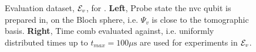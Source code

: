 \begin{figure}
    \begin{center}
        \qquad
    \end{center}
    \caption[Evaluation dataset for  ]{
        Evaluation dataset, ${ \mathcal{E} }_v$, for  . 
        \textbf{Left}, Probe state the \gls{nvc}  qubit is prepared in, on the Bloch sphere, 
            i.e. $\Psi_v$ is close to the tomographic basis. 
        \textbf{Right}, Time comb evaluated against, i.e. uniformly distributed times up to $t_{max} = 100 \mu \textrm{s}$ 
            are used for experiments in ${ \mathcal{E} }_v$. 
        }
    \label{fig:nv_ga_eval_data}
\end{figure}    

\par 

